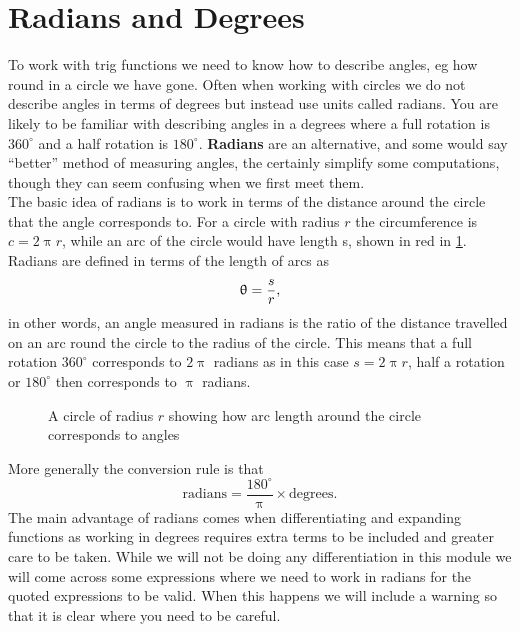 \section{Radians and Degrees}
To work with trig functions  we need to know how to describe angles, eg how round in a circle we have gone. Often when working with circles we do not describe angles in terms of degrees but instead use units called radians.  You are likely to be familiar with describing angles in a degrees where a full rotation is $360^{\circ}$ and a half rotation is $180^{\circ}$. \textbf{Radians} are an alternative, and some would say ``better'' method of measuring angles, the certainly simplify some computations, though they can seem confusing when we first meet them.\\

The basic idea of radians is to work in terms of the distance around the circle that the angle corresponds to.  For a circle with radius $r$ the circumference is $c=2\uppi r$, while an arc of the circle would have length s, shown in red in \cref{fig: radians}. Radians are defined in terms of the length of arcs as
\begin{equation}
\uptheta =\frac{s}{r},
\label{eq: definition of radians}
\end{equation}
in other words, an angle measured in radians is the ratio of the distance travelled on an arc round the circle to the radius of the circle. 
This means that a full rotation $360^{\circ}$ corresponds to $2\uppi$ radians as in this case $s=2\uppi r$, half a rotation or $180^{\circ}$ then corresponds to $\uppi$ radians. 

\begin{figure}[ht]
    \centering
    \caption{A circle of radius $r$ showing how arc length around the circle corresponds to angles}
        \label{fig: radians}
\end{figure}

More generally the conversion rule is that
\begin{equation*}
\text{radians} = \frac{180^{\circ}}{\uppi}\times \text{degrees}.
\end{equation*}
The main advantage of radians comes when differentiating and expanding functions as working in degrees requires extra terms to be included and greater care to be taken. While we will not be doing any differentiation in this module we will come across some expressions where we need to work in radians for the quoted expressions to be valid. When this happens we will include a warning so that it is clear where you need to be careful.\\

